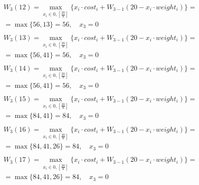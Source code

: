 \documentclass[17pt]{extarticle}
\begin{document}
\[
    \begin{aligned}
         & W_3(12)=\max_{x_i \in \overline{0, \left[\frac{20}{8}\right]}} \{x_i \cdot cost_i + W_{3-1}(20 - x_i \cdot weight_i)\}= \\& = \max \{
        56, 13\}= 56, \quad x_3 = 0                                                                                                \\
    \end{aligned}
\]
\[
    \begin{aligned}
         & W_3(13)=\max_{x_i \in \overline{0, \left[\frac{20}{8}\right]}} \{x_i \cdot cost_i + W_{3-1}(20 - x_i \cdot weight_i)\}= \\& = \max \{
        56, 41\}= 56, \quad x_3 = 0                                                                                                \\
    \end{aligned}
\]
\[
    \begin{aligned}
         & W_3(14)=\max_{x_i \in \overline{0, \left[\frac{20}{8}\right]}} \{x_i \cdot cost_i + W_{3-1}(20 - x_i \cdot weight_i)\}= \\& = \max \{
        56, 41\}= 56, \quad x_3 = 0                                                                                                \\
    \end{aligned}
\]
\[
    \begin{aligned}
         & W_3(15)=\max_{x_i \in \overline{0, \left[\frac{20}{8}\right]}} \{x_i \cdot cost_i + W_{3-1}(20 - x_i \cdot weight_i)\}= \\& = \max \{
        84, 41\}= 84, \quad x_3 = 0                                                                                                \\
    \end{aligned}
\]
\[
    \begin{aligned}
         & W_3(16)=\max_{x_i \in \overline{0, \left[\frac{20}{8}\right]}} \{x_i \cdot cost_i + W_{3-1}(20 - x_i \cdot weight_i)\}= \\& = \max \{
        84, 41, 26\}= 84, \quad x_3 = 0                                                                                            \\
    \end{aligned}
\]
\[
    \begin{aligned}
         & W_3(17)=\max_{x_i \in \overline{0, \left[\frac{20}{8}\right]}} \{x_i \cdot cost_i + W_{3-1}(20 - x_i \cdot weight_i)\}= \\& = \max \{
        84, 41, 26\}= 84, \quad x_3 = 0                                                                                            \\
    \end{aligned}
\]
\end{document}
